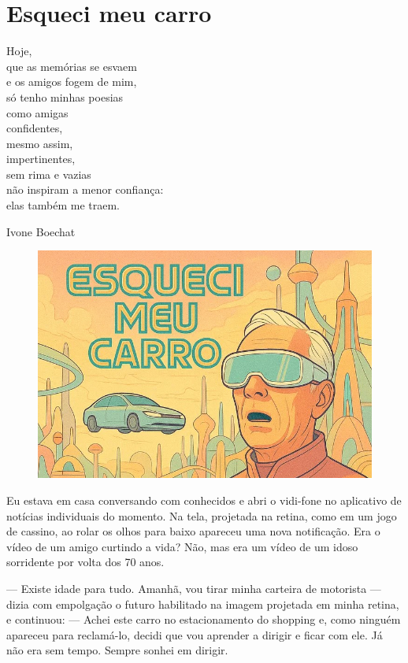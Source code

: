 \documentclass[a4paper,14pt]{book}
\begin{document}

\chapter{Esqueci meu carro}

\epigraph{Hoje, \\
que as memórias se esvaem \\
e os amigos fogem de mim, \\
só tenho minhas poesias \\
como amigas \\
confidentes, \\
mesmo assim, \\
impertinentes, \\ 
sem rima e vazias \\
não inspiram a menor confiança: \\
elas também me traem.}{Ivone Boechat}

\begin{figure}[h!]
    \includegraphics[width=1\linewidth]{img/esqueci_meu_carro.jpg}
\end{figure}

Eu estava em casa conversando com conhecidos e abri o vidi-fone no aplicativo de notícias individuais do momento. Na tela, projetada na retina, como em um jogo de cassino, ao rolar os olhos para baixo apareceu uma nova notificação. Era o vídeo de um amigo curtindo a vida? Não, mas era um vídeo de um idoso sorridente por volta dos 70 anos.

— Existe idade para tudo. Amanhã, vou tirar minha carteira de motorista — dizia com empolgação o futuro habilitado na imagem projetada em minha retina, e continuou: — Achei este carro no estacionamento do shopping e, como ninguém apareceu para reclamá-lo, decidi que vou aprender a dirigir e ficar com ele. Já não era sem tempo. Sempre sonhei em dirigir.
\end{document}
